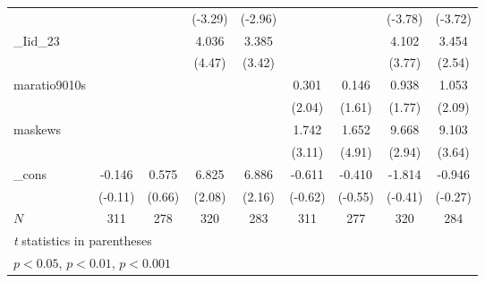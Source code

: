 {\begin{tabular}{l*{8}{c}}
            &                     &                     &     (-3.29)         &     (-2.96)         &                     &                     &     (-3.78)         &     (-3.72)         \\
[1em]
\_Iid\_23     &                     &                     &       4.036\sym{***}&       3.385\sym{***}&                     &                     &       4.102\sym{***}&       3.454\sym{*}  \\
            &                     &                     &      (4.47)         &      (3.42)         &                     &                     &      (3.77)         &      (2.54)         \\
[1em]
maratio9010s&                     &                     &                     &                     &       0.301\sym{*}  &       0.146         &       0.938         &       1.053\sym{*}  \\
            &                     &                     &                     &                     &      (2.04)         &      (1.61)         &      (1.77)         &      (2.09)         \\
[1em]
maskews     &                     &                     &                     &                     &       1.742\sym{**} &       1.652\sym{***}&       9.668\sym{**} &       9.103\sym{***}\\
            &                     &                     &                     &                     &      (3.11)         &      (4.91)         &      (2.94)         &      (3.64)         \\
[1em]
\_cons      &      -0.146         &       0.575         &       6.825\sym{*}  &       6.886\sym{*}  &      -0.611         &      -0.410         &      -1.814         &      -0.946         \\
            &     (-0.11)         &      (0.66)         &      (2.08)         &      (2.16)         &     (-0.62)         &     (-0.55)         &     (-0.41)         &     (-0.27)         \\
\hline
\(N\)       &         311         &         278         &         320         &         283         &         311         &         277         &         320         &         284         \\
\hline\hline
\multicolumn{9}{l}{\footnotesize \textit{t} statistics in parentheses}\\
\multicolumn{9}{l}{\footnotesize \sym{*} \(p<0.05\), \sym{**} \(p<0.01\), \sym{***} \(p<0.001\)}\\
\end{tabular}
}
